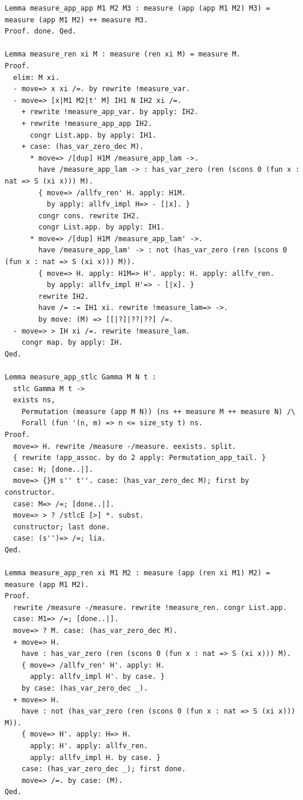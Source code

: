 \documentclass[10pt,a4paper]{article}
\begin{document}
\begin{lstlisting}[style=authorcoq]
Lemma measure_app_app M1 M2 M3 : measure (app (app M1 M2) M3) = measure (app M1 M2) ++ measure M3.
Proof. done. Qed.

Lemma measure_ren xi M : measure (ren xi M) = measure M.
Proof.
  elim: M xi.
  - move=> x xi /=. by rewrite !measure_var.
  - move=> [x|M1 M2|t' M] IH1 N IH2 xi /=.
    + rewrite !measure_app_var. by apply: IH2.
    + rewrite !measure_app_app IH2.
      congr List.app. by apply: IH1.
    + case: (has_var_zero_dec M).
      * move=> /[dup] H1M /measure_app_lam ->.
        have /measure_app_lam -> : has_var_zero (ren (scons 0 (fun x : nat => S (xi x))) M).
        { move=> /allfv_ren' H. apply: H1M.
          by apply: allfv_impl H=> - [|x]. }
        congr cons. rewrite IH2.
        congr List.app. by apply: IH1.
      * move=> /[dup] H1M /measure_app_lam' ->.
        have /measure_app_lam' -> : not (has_var_zero (ren (scons 0 (fun x : nat => S (xi x))) M)).
        { move=> H. apply: H1M=> H'. apply: H. apply: allfv_ren.
          by apply: allfv_impl H'=> - [|x]. }
        rewrite IH2.
        have /= := IH1 xi. rewrite !measure_lam=> ->.
        by move: (M) => [[|?]|??|??] /=.
  - move=> > IH xi /=. rewrite !measure_lam.
    congr map. by apply: IH.
Qed.

Lemma measure_app_stlc Gamma M N t :
  stlc Gamma M t ->
  exists ns,
    Permutation (measure (app M N)) (ns ++ measure M ++ measure N) /\
    Forall (fun '(n, m) => n <= size_sty t) ns.
Proof.
  move=> H. rewrite /measure -/measure. eexists. split.
  { rewrite !app_assoc. by do 2 apply: Permutation_app_tail. }
  case: H; [done..|].
  move=> {}M s'' t''. case: (has_var_zero_dec M); first by constructor.
  case: M=> /=; [done..|].
  move=> > ? /stlcE [>] *. subst.
  constructor; last done.
  case: (s'')=> /=; lia.
Qed.

Lemma measure_app_ren xi M1 M2 : measure (app (ren xi M1) M2) = measure (app M1 M2).
Proof.
  rewrite /measure -/measure. rewrite !measure_ren. congr List.app.
  case: M1=> /=; [done..|].
  move=> ? M. case: (has_var_zero_dec M).
  + move=> H.
    have : has_var_zero (ren (scons 0 (fun x : nat => S (xi x))) M).
    { move=> /allfv_ren' H'. apply: H.
      apply: allfv_impl H'. by case. }
    by case: (has_var_zero_dec _).
  + move=> H.
    have : not (has_var_zero (ren (scons 0 (fun x : nat => S (xi x))) M)).
    { move=> H'. apply: H=> H.
      apply: H'. apply: allfv_ren.
      apply: allfv_impl H. by case. }
    case: (has_var_zero_dec _); first done.
    move=> /=. by case: (M).
Qed.


\end{lstlisting}
\end{document}
